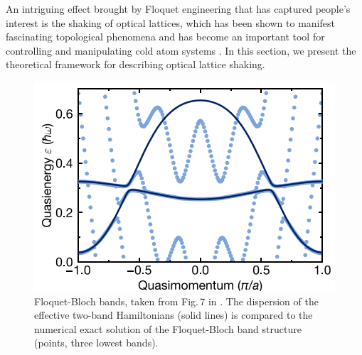 \documentclass[reprint, amsmath, amssymb, aps]{revtex4-2}
\begin{document}
An intriguing effect brought by Floquet engineering that has captured people's interest is the shaking of optical lattices, which has been shown to manifest fascinating topological phenomena  \cite{12, 16,17,18,19} and has become an important tool for controlling and manipulating cold atom systems \cite{15,24,25}. In this section, we present the theoretical framework for describing optical lattice shaking. \\

\begin{figure}
\includegraphics[scale=0.85]{F5}
\caption{Floquet-Bloch bands, taken from Fig.\,7 in \cite{Sandholzer}. The dispersion of the effective two-band Hamiltonians (solid lines) is compared to the numerical exact solution of the Floquet-Bloch band structure (points, three lowest bands). }
\end{figure}
\end{document}
